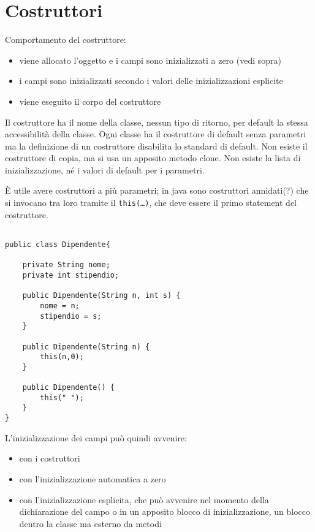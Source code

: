 \section{Costruttori}
Comportamento del costruttore:
\begin{itemize}
\item viene allocato l'oggetto e i campi sono inizializzati a zero (vedi sopra)
\item i campi sono inizializzati secondo i valori delle inizializzazioni esplicite
\item viene eseguito il corpo del costruttore
\end{itemize}


Il costruttore ha il nome della classe, nessun tipo di ritorno, per default la stessa accessibilità della classe.
Ogni classe ha il costruttore di default senza parametri ma la definizione di un costruttore disabilita lo standard di default.
Non esiste il costruttore di copia, ma si usa un apposito metodo clone.
Non esiste la lista di inizializzazione, né i valori di default per i parametri.

È utile avere costruttori a più parametri; in java sono costruttori annidati(?) che si invocano tra loro tramite il \texttt{this(…)}, che deve essere il primo statement del costruttore.

\begin{framed}
\begin{verbatim}

public class Dipendente{
    
    private String nome;
    private int stipendio;
    
    public Dipendente(String n, int s) {
        nome = n;
        stipendio = s;
    }

    public Dipendente(String n) {
        this(n,0);
    }

    public Dipendente() {
        this(" ");
    }    
}

\end{verbatim}
\end{framed}

L'inizializzazione dei campi può quindi avvenire:

\begin{itemize}
\item con i costruttori
\item con l'inizializzazione automatica a zero
\item con l'inizializzazione esplicita, che può avvenire nel momento della dichiarazione del campo o in un apposito blocco di inizializzazione, un blocco dentro la classe ma esterno da metodi
\end{itemize}

